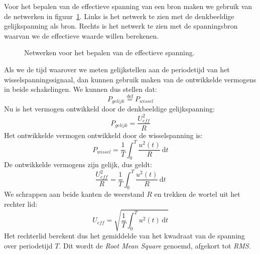 Voor het bepalen van de effectieve spanning van een bron maken we gebruik van de netwerken in figuur~\ref{fig:spanetwereffectief}. Links is het netwerk te zien met de denkbeeldige gelijkspanning als bron. Rechts is het netwerk te zien met de spanningsbron waarvan we de effectieve waarde willen berekenen.

\begin{figure}[!ht]
\centering
{}
\caption{Netwerken voor het bepalen van de effectieve spanning.}
\label{fig:spanetwereffectief}
\end{figure}

Als we de tijd waarover we meten gelijkstellen aan de periodetijd van het wisselspanningssignaal, dan kunnen gebruik maken van de ontwikkelde vermogens in beide schakelingen. We kunnen dus stellen dat:
%
\begin{equation}
P_{gelijk} \overset{\mathrm{def}}{=} P_{wissel}
\end{equation}
%
Nu is het vermogen ontwikkeld door de denkbeeldige gelijkspanning:
%
\begin{equation}
P_{gelijk} = \dfrac{U^2_{eff}}{R}
\end{equation}
Het ontwikkelde vermogen ontwikkeld door de wisselspanning is:
\begin{equation}
P_{wissel} = \dfrac{1}{T}\int_0^T\dfrac{u^2(t)}{R}\,\mathrm{d}t
\end{equation}
%
De ontwikkelde vermogens zijn gelijk, dus geldt:
%
\begin{equation}
\dfrac{U^2_{eff}}{R} = \dfrac{1}{T}\int_0^T\dfrac{u^2(t)}{R}\,\mathrm{d}t
\end{equation}
%
We schrappen aan beide kanten de weerstand $R$ en trekken de wortel uit het rechter lid:
%
\begin{equation}
U_{eff} = \sqrt{\dfrac{1}{T}\int_0^Tu^2(t)\,\mathrm{d}t}
\end{equation}
%
Het rechterlid berekent dus het gemiddelde van het kwadraat van de spanning over periodetijd $T$. Dit wordt de \textsl{Root Mean Square} genoemd, afgekort tot \textsl{RMS}.

